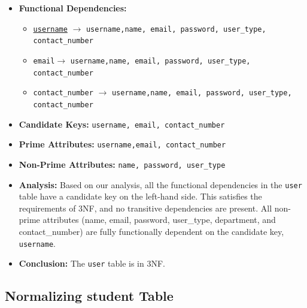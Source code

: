 \begin{itemize}
    \item \textbf{Functional Dependencies:}
    \begin{itemize}
        \item \texttt{\underline{username}} $\rightarrow$ \texttt{username,name, email, password, user\_type, contact\_number}
    \end{itemize}
    \begin{itemize}
        \item \texttt{email}$\rightarrow$ \texttt{username,name, email, password, user\_type, contact\_number}
    \end{itemize}
    \begin{itemize}
        \item \texttt{contact\_number} $\rightarrow$ \texttt{username,name, email, password, user\_type, contact\_number}
    \end{itemize}



    \item \textbf{Candidate Keys:} \texttt{username, email, contact\_number}
    
    \item \textbf{Prime Attributes:} \texttt{username,email, contact\_number}

    \item \textbf{Non-Prime Attributes:} \texttt{name, password, user\_type}

    \item \textbf{Analysis:} Based on our analysis, all the functional dependencies in the \texttt{user} table have a candidate key on the left-hand side. This satisfies the requirements of 3NF, and no transitive dependencies are present. All non-prime attributes (name, email, password, user\_type, department, and contact\_number) are fully functionally dependent on the candidate key, \texttt{username}.

    \item \textbf{Conclusion:} The \texttt{user} table is in 3NF.
\end{itemize}

\subsection{Normalizing student Table}

